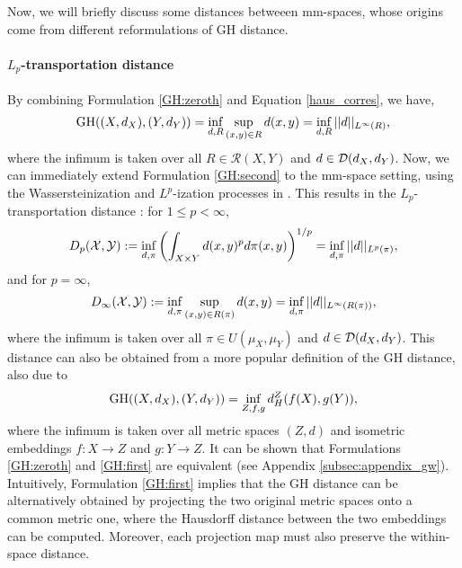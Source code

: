 Now, we will briefly discuss some distances betweeen mm-spaces, whose origins come from
different reformulations of GH distance.
\paragraph{$L_p$-transportation distance}
By combining Formulation \eqref{GH:zeroth} and Equation \eqref{haus_corres}, we have,
\begin{align}
  \label{GH:second}
    \text{GH}((X,d_X), (Y,d_Y)) = \inf_{d, R} \sup_{(x,y) \in R} d(x,y) =
    \inf_{d,R} || d ||_{L^{\infty}(R)},
\end{align}
where the infimum is taken over all $R \in \mathcal R(X,Y)$ and $d \in \mathcal D(d_X, d_Y)$.
Now, we can immediately extend Formulation \eqref{GH:second} to the mm-space setting,
using the Wassersteinization and $L^p$-ization processes in .
This results in the $L_p$-transportation distance \citep{Sturm06}: for $1 \leq p < \infty$,
\begin{align}
    D_p(\mathcal X, \mathcal Y) := \inf_{d, \pi} \left( \int_{X \times Y} d(x,y)^p d\pi(x,y) \right)^{1/p}
    = \inf_{d, \pi} || d ||_{L^p(\pi)},
\end{align}
and for $p = \infty$,
\begin{align}
    D_{\infty}(\mathcal X, \mathcal Y) := \inf_{d, \pi} \sup_{(x,y) \in R(\pi)} d(x,y) =
    \inf_{ d, \pi} || d ||_{L^{\infty}(R(\pi))},
\end{align}
where the infimum is taken over all $\pi \in U(\mu_X, \mu_Y)$ and $d \in \mathcal D(d_X, d_Y)$.
This distance can also be obtained from a more popular definition of the GH distance,
also due to \citet{Gromov99}
\begin{align}
   \label{GH:first}
  \text{GH}((X,d_X), (Y,d_Y)) = \inf_{Z, f, g} d_{ H}^{Z}(f(X), g(Y)),
\end{align}
where the infimum is taken over all metric spaces $(Z,d)$ and isometric embeddings
$f: X \to Z$ and $g: Y \to Z$. It can be shown that Formulations \eqref{GH:zeroth} and \eqref{GH:first}
are equivalent (see Appendix \ref{subsec:appendix_gw}). Intuitively,
Formulation \eqref{GH:first} implies that
the GH distance can be alternatively obtained by projecting the two original metric spaces
onto a common metric one, where the Hausdorff distance between the two embeddings can be computed.
Moreover, each projection map must also preserve the within-space distance.

